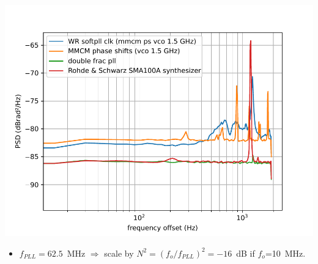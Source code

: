 \documentclass[compress,10pt,aspectratio=169]{beamer}
\begin{document}
\begin{frame}[fragile]
\begin{minipage}[t]{1.06\linewidth}
\begin{minipage}{.49\linewidth}
\includegraphics[width=1.05\linewidth]{dmtd_phase_noise_by_clk_src.pdf}

\begin{itemize}
\item $f_{PLL}=62.5$~MHz $\Rightarrow$ scale by $N^2=(f_o/f_{PLL})^2=-16$~dB if
$f_o$=10~MHz.
\end{itemize}
\end{minipage}
\end{minipage}
\end{frame}
\end{document}
